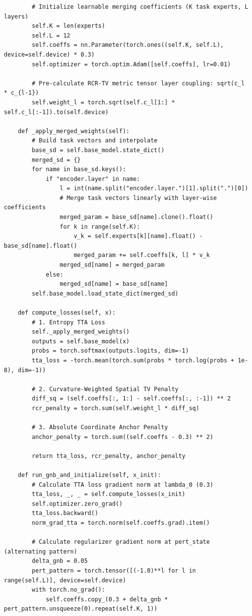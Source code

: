 \documentclass{article}
\theoremstyle{plain}
\theoremstyle{definition}
\theoremstyle{remark}
\begin{document}
\begin{small}
\begin{verbatim}
        # Initialize learnable merging coefficients (K task experts, L layers)
        self.K = len(experts)
        self.L = 12
        self.coeffs = nn.Parameter(torch.ones((self.K, self.L), device=self.device) * 0.3)
        self.optimizer = torch.optim.Adam([self.coeffs], lr=0.01)
        
        # Pre-calculate RCR-TV metric tensor layer coupling: sqrt(c_l * c_{l-1})
        self.weight_l = torch.sqrt(self.c_l[1:] * self.c_l[:-1]).to(self.device)
        
    def _apply_merged_weights(self):
        # Build task vectors and interpolate
        base_sd = self.base_model.state_dict()
        merged_sd = {}
        for name in base_sd.keys():
            if "encoder.layer" in name:
                l = int(name.split("encoder.layer.")[1].split(".")[0])
                # Merge task vectors linearly with layer-wise coefficients
                merged_param = base_sd[name].clone().float()
                for k in range(self.K):
                    v_k = self.experts[k][name].float() - base_sd[name].float()
                    merged_param += self.coeffs[k, l] * v_k
                merged_sd[name] = merged_param
            else:
                merged_sd[name] = base_sd[name]
        self.base_model.load_state_dict(merged_sd)

    def compute_losses(self, x):
        # 1. Entropy TTA Loss
        self._apply_merged_weights()
        outputs = self.base_model(x)
        probs = torch.softmax(outputs.logits, dim=-1)
        tta_loss = -torch.mean(torch.sum(probs * torch.log(probs + 1e-8), dim=-1))
        
        # 2. Curvature-Weighted Spatial TV Penalty
        diff_sq = (self.coeffs[:, 1:] - self.coeffs[:, :-1]) ** 2
        rcr_penalty = torch.sum(self.weight_l * diff_sq)
        
        # 3. Absolute Coordinate Anchor Penalty
        anchor_penalty = torch.sum((self.coeffs - 0.3) ** 2)
        
        return tta_loss, rcr_penalty, anchor_penalty

    def run_gnb_and_initialize(self, x_init):
        # Calculate TTA loss gradient norm at lambda_0 (0.3)
        tta_loss, _, _ = self.compute_losses(x_init)
        self.optimizer.zero_grad()
        tta_loss.backward()
        norm_grad_tta = torch.norm(self.coeffs.grad).item()
        
        # Calculate regularizer gradient norm at pert_state (alternating pattern)
        delta_gnb = 0.05
        pert_pattern = torch.tensor([(-1.0)**l for l in range(self.L)], device=self.device)
        with torch.no_grad():
            self.coeffs.copy_(0.3 + delta_gnb * pert_pattern.unsqueeze(0).repeat(self.K, 1))
            

\end{verbatim}
\end{small}
\end{document}
